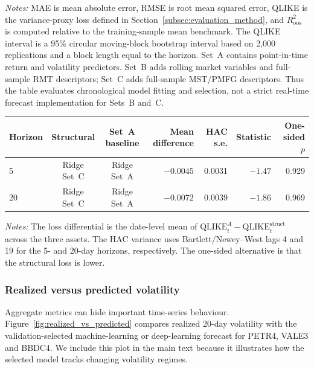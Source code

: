 \noindent\footnotesize\emph{Notes:} MAE is mean absolute error, RMSE is root mean squared error, QLIKE is the variance-proxy loss defined in Section~\ref{subsec:evaluation_method}, and $R^2_{\mathrm{oos}}$ is computed relative to the training-sample mean benchmark. The QLIKE interval is a 95\% circular moving-block bootstrap interval based on 2,000 replications and a block length equal to the horizon. Set~A contains point-in-time return and volatility predictors. Set~B adds rolling market variables and full-sample RMT descriptors; Set~C adds full-sample MST/PMFG descriptors. Thus the table evaluates chronological model fitting and selection, not a strict real-time forecast implementation for Sets~B and~C.

\normalsize

\begin{center}
\label{tab:forecast_loss_test}
\begin{tabular}{lccrrrr}
\toprule
Horizon & Structural & Set~A baseline & Mean difference & HAC s.e. & Statistic & One-sided $p$ \\
\midrule
5 & Ridge Set~C & Ridge Set~A & $-0.0045$ & 0.0031 & $-1.47$ & 0.929 \\
20 & Ridge Set~C & Ridge Set~A & $-0.0072$ & 0.0039 & $-1.86$ & 0.969 \\
\bottomrule
\end{tabular}
\end{center}

\noindent\footnotesize\emph{Notes:} The loss differential is the date-level mean of $\mathrm{QLIKE}^{A}_t-\mathrm{QLIKE}^{\mathrm{struct}}_t$ across the three assets. The HAC variance uses Bartlett/Newey--West lags 4 and 19 for the 5- and 20-day horizons, respectively. The one-sided alternative is that the structural loss is lower.\normalsize

\subsubsection{Realized versus predicted volatility}

Aggregate metrics can hide important time-series behaviour. Figure~\ref{fig:realized_vs_predicted} compares realized 20-day volatility with the validation-selected machine-learning or deep-learning forecast for PETR4, VALE3 and BBDC4. We include this plot in the main text because it illustrates how the selected model tracks changing volatility regimes.

